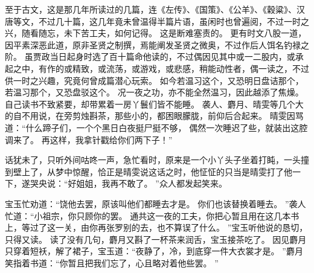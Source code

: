 至于古文，这是那几年所读过的几篇，连《左传》、《国策》、《公羊》、《穀粱》、汉唐等文，不过几十篇，这几年竟未曾温得半篇片语，虽闲时也曾遍阅，不过一时之兴，随看随忘，未下苦工夫，如何记得。
这是断难塞责的。
更有时文八股一道，因平素深恶此道，原非圣贤之制撰，焉能阐发圣贤之微奥，不过作后人饵名钓禄之阶。
虽贾政当日起身时选了百十篇命他读的，不过偶因见其中或一二股内，或承起之中，有作的或精致，或流荡，或游戏，或悲感，稍能动性者，偶一读之，不过供一时之兴趣，究竟何曾成篇潜心玩索。
如今若温习这个，又恐明日盘诘那个，若温习那个，又恐盘驳这个。
况一夜之功，亦不能全然温习，因此越添了焦燥。
自己读书不致紧要，却带累着一房丫鬟们皆不能睡。
袭人、麝月、晴雯等几个大的自不用说，在旁剪烛斟茶，那些小的，都困眼朦胧，前仰后合起来。
晴雯因骂道：“什么蹄子们，一个个黑日白夜挺尸挺不够，
偶然一次睡迟了些，就装出这腔调来了。
再这样，我拿针戳给你们两下子！”\par
话犹未了，只听外间咕咚一声，急忙看时，原来是一个小丫头子坐着打盹，一头撞到壁上了，从梦中惊醒，恰正是晴雯说这话之时，他怔怔的只当是晴雯打了他一下，遂哭央说：“好姐姐，我再不敢了。
”众人都发起笑来。
\par
宝玉忙劝道：“饶他去罢，原该叫他们都睡去才是。
你们也该替换着睡去。
”袭人忙道：“小祖宗，你只顾你的罢。
通共这一夜的工夫，你把心暂且用在这几本书上，等过了这一关，由你再张罗别的去，也不算误了什么。
”宝玉听他说的恳切，只得又读。
读了没有几句，麝月又斟了一杯茶来润舌，宝玉接茶吃了。
因见麝月只穿着短袄，解了裙子，宝玉道：“夜静了，冷，到底穿一件大衣裳才是。
”麝月笑指着书道：“你暂且把我们忘了，心且略对着他些罢。
”\par
